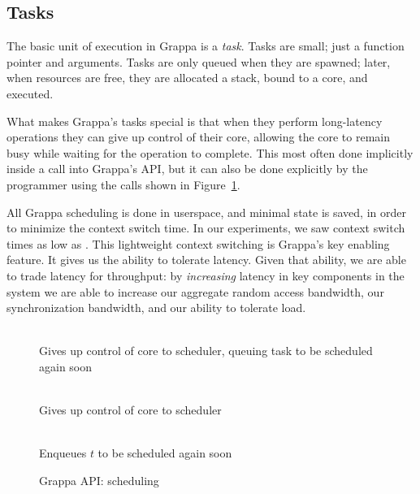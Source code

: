 \subsection{Tasks}


The basic unit of execution in Grappa is a {\em task}. Tasks are
small; just a function pointer and arguments. Tasks are only
queued when they are spawned; later, when resources are free, they are
allocated a stack, bound to a core, and executed.

What makes Grappa's tasks special is that when they perform
long-latency operations they can give up control of their core,
allowing the core to remain busy while waiting for the operation to
complete. This most often done implicitly inside a call into Grappa's
API, but it can also be done explicitly by the programmer using the
calls shown in Figure~\ref{fig:scheduling}. 

All Grappa scheduling is done in userspace, and minimal state is
saved, in order to minimize the context switch time. In our
experiments, we saw context switch times as low as .
This lightweight context switching is Grappa's key enabling
feature. It gives us the ability to tolerate latency. Given that
ability, we are able to trade latency for throughput: by {\em
  increasing} latency in key components in the system we are able to
increase our aggregate random access bandwidth, our synchronization
bandwidth, and our ability to tolerate load.

\begin{figure}[htbp]
  \begin{center}
    \begin{description}\small
    \item[ \texttt{ yield() } ] \hfill \\
      Gives up control of core to scheduler, queuing task to be scheduled again soon
    \item[ \texttt{ suspend() } ] \hfill \\
      Gives up control of core to scheduler
    \item[ \texttt{ wake( task * $t$ ) } ] \hfill \\
      Enqueues $t$ to be scheduled again soon
    \end{description}
    \begin{minipage}{0.95\columnwidth}
      \caption{\label{fig:scheduling} Grappa API: scheduling} %
    \end{minipage}
  \end{center}
\end{figure}


